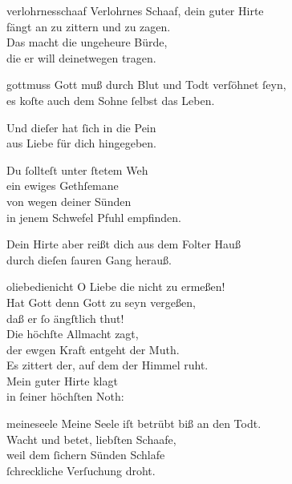 \documentclass[tocstyle=ref-genre]{ees}
\begin{document}
{\begin{movement}{verlohrnesschaaf}
  Verlohrnes Schaaf, dein guter Hirte\\
  fängt an zu zittern und zu zagen.\\
  Das macht die ungeheure Bürde,\\
  die er will deinetwegen tragen.
\end{movement}

\begin{movement}{gottmuss}
  Gott muß durch Blut und Todt verſöhnet ſeyn,\\
  es koſte auch dem Sohne ſelbst das Leben.

  Und dieſer hat ſich in die Pein\\
  aus Liebe für dich hingegeben.

  Du ſollteſt unter ſtetem Weh\\
  ein ewiges Gethſemane\\
  von wegen deiner Sünden\\
  in jenem Schwefel Pfuhl empfinden.

  Dein Hirte aber reißt dich aus dem Folter Hauß\\
  durch dieſen ſauren Gang herauß.
\end{movement}

\begin{movement}{oliebedienicht}
  O Liebe die nicht zu ermeßen!\\
  Hat Gott denn Gott zu seyn vergeßen,\\
  daß er ſo ängſtlich thut!\\
  Die höchſte Allmacht zagt,\\
  der ewgen Kraft entgeht der Muth.\\
  Es zittert der, auf dem der Himmel ruht.\\
  Mein guter Hirte klagt\\
  in ſeiner höchſten Noth:
\end{movement}

\begin{movement}{meineseele}
  Meine Seele iſt betrübt biß an den Todt.\\
  Wacht und betet, liebſten Schaafe,\\
  weil dem ſichern Sünden Schlafe\\
  ſchreckliche Verſuchung droht.
\end{movement}

}
\end{document}
